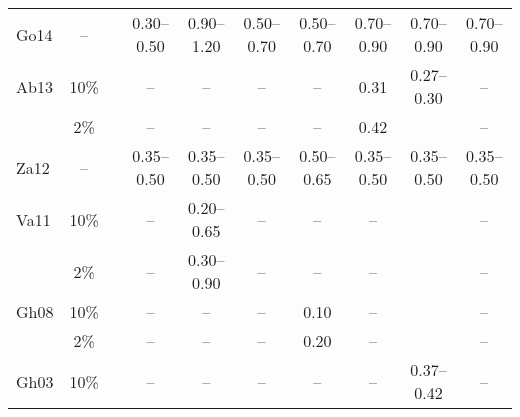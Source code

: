 \begin{table*}[t]
\begin{tabular}{lcccccccccc}
    \multicolumn{2}{l}{Go14}
                    &  --    && 0.30--0.50  & 0.90--1.20  & 0.50--0.70  & 0.50--0.70  & 0.70--0.90  & 0.70--0.90  & 0.70--0.90  \\
    \multicolumn{2}{l}{Ab13}
                    &  10\%  &&   --        &   --        &   --        &   --        &   0.31      & 0.27--0.30  &   --        \\
            &       &   2\%  &&   --        &   --        &   --        &   --        &   0.42      &             &   --        \\
    \multicolumn{2}{l}{Za12}
                    &  --    && 0.35--0.50  & 0.35--0.50  & 0.35--0.50  & 0.50--0.65  & 0.35--0.50  & 0.35--0.50  & 0.35--0.50  \\
    \multicolumn{2}{l}{Va11}                
                    &  10\%  &&   --        & 0.20--0.65  &   --        &   --        &   --        &             &   --        \\
            &       &   2\%  &&   --        & 0.30--0.90  &   --        &   --        &   --        &             &   --        \\
    \multicolumn{2}{l}{Gh08}        
                    &  10\%  &&   --        &   --        &   --        &   0.10      &   --        &             &   --        \\
            &       &   2\%  &&   --        &   --        &   --        &   0.20      &   --        &             &   --        \\
    \multicolumn{2}{l}{Gh03}
                    &  10\%  &&   --        &   --        &   --        &   --        &   --        & 0.37--0.42  &   --        \\[0.6ex]
    \hline
\end{tabular}
\label{tab:pga} 
\end{table*}

